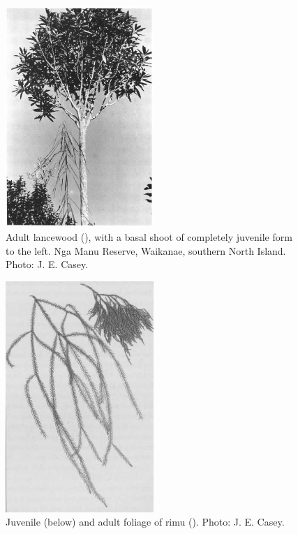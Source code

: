 \begin{figure}
	\includegraphics[width=0.5\textwidth]{graphics/figure20lancewood.jpg}
	\centering
	\caption[Adult lancewood]{Adult lancewood (), with a basal shoot of completely juvenile form to the left.
Nga Manu Reserve, Waikanae, southern North Island.
	Photo: J. E. Casey.}
	\label{fig:20lancewood}
\end{figure}

\begin{figure}
	\includegraphics[width=0.5\textwidth]{graphics/figure21rimu.jpg}
	\centering
	\caption[Rimu foliage]{Juvenile (below) and adult foliage of rimu ().
	Photo: J. E. Casey.}
	\label{fig:21rimu}
\end{figure}

